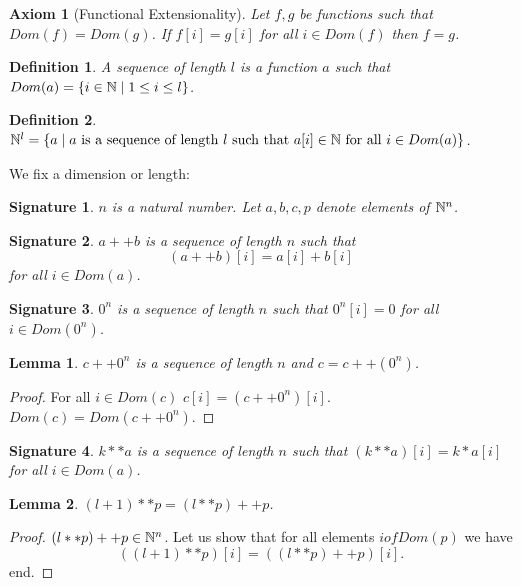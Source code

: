 \documentclass[12pt]{article}
\newtheorem{signature}{Signature}
\newtheorem{axiom}{Axiom}
\newtheorem{definition}{Definition}
\newtheorem{lemma}{Lemma}
\newcommand{\NN}{{\Bbb N}}
\begin{document}
\begin{axiom}[Functional Extensionality] Let $f,g$ be functions 
such that $Dom(f) = Dom(g)$.
If $f[i] = g[i]$ for all $i \in Dom(f)$ then $f = g$.
\end{axiom}

\begin{definition} A \emph{sequence of length} $l$ is a function 
$a$ such that 
$Dom(a) = \{i \in \NN \mid 1 \leq i \leq l\}$.
\end{definition}

\begin{definition} 
$\NN^{l} = \{a \mid a \text{ is a sequence of length } l 
\text{ such that } a[i] \in \NN 
\text{ for all }i \in Dom(a)\}$.
\end{definition}

We fix a dimension or length:

\begin{signature} $n$ is a natural number.
Let $a,b,c,p$ denote elements of $\NN^{n}$.
\end{signature}

\begin{signature} $a ++ b$ is a sequence of length $n$
such that $$(a ++ b)[i] = a[i] + b[i]$$ 
for all $i \in Dom(a)$.
\end{signature}

\begin{signature} $0^{n}$ is a sequence of length $n$ such that
$0^{n}[i] = 0$ for all $i \in Dom(0^{n})$.
\end{signature}

\begin{lemma} $c ++ 0^{n}$ is a sequence of length $n$
and $c = c ++ (0^{n})$.
\end{lemma}
\begin{proof} For all $i \in Dom(c)$ 
$c[i] = (c ++ 0^{n})[i]$. 
$Dom(c) = Dom(c ++ 0^{n})$.
\end{proof}

\begin{signature} $k ** a$ is a sequence of length $n$ such that
$(k ** a)[i] = k * a[i]$ for all $i \in Dom(a)$.
\end{signature}

\begin{lemma} $(l + 1) ** p = (l ** p) ++ p$.
\end{lemma}
\begin{proof} $(l ** p) ++ p \in \NN^{n}$.
Let us show that for all elements $i of Dom(p)$ we have 
$$((l + 1) ** p)[i] = ((l ** p) ++ p)[i].$$
end.
\end{proof}
\end{document}
